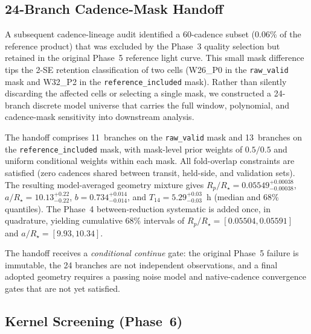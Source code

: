 \documentclass[11pt]{article}
\begin{document}
\subsection{24-Branch Cadence-Mask Handoff}
\label{sec:handoff}

A subsequent cadence-lineage audit identified a 60-cadence subset
(0.06\% of the reference product) that was excluded by the Phase~3 quality
selection but retained in the original Phase~5 reference light curve.  This
small mask difference tips the 2-SE retention classification of two cells
(W26\_P0 in the \texttt{raw\_valid} mask and W32\_P2 in the
\texttt{reference\_included} mask).  Rather than silently discarding the
affected cells or selecting a single mask, we constructed a 24-branch
discrete model universe that carries the full window, polynomial, and
cadence-mask sensitivity into downstream analysis.

The handoff comprises 11~branches on the \texttt{raw\_valid} mask and
13~branches on the \texttt{reference\_included} mask, with mask-level
prior weights of $0.5/0.5$ and uniform conditional weights within each
mask.  All fold-overlap constraints are satisfied (zero cadences shared
between transit, held-side, and validation sets).  The resulting
model-averaged geometry mixture gives
$R_p/R_\star = 0.05549^{+0.00038}_{-0.00038}$,
$a/R_\star = 10.13^{+0.22}_{-0.22}$,
$b = 0.734^{+0.014}_{-0.014}$, and
$T_{14} = 5.29^{+0.03}_{-0.03}$~h (median and 68\% quantiles).
The Phase~4 between-reduction systematic is added once, in quadrature,
yielding cumulative 68\% intervals of
$R_p/R_\star = [0.05504, 0.05591]$ and
$a/R_\star = [9.93, 10.34]$.

The handoff receives a \emph{conditional continue} gate: the original
Phase~5 failure is immutable, the 24 branches are not independent
observations, and a final adopted geometry requires a passing noise model
and native-cadence convergence gates that are not yet satisfied.

\subsection{Kernel Screening (Phase~6)}
\label{sec:kernel_screening}
\end{document}
